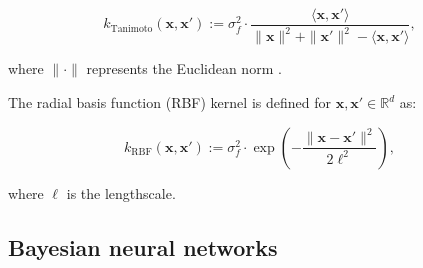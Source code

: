 $$
k_{\text{Tanimoto}}(\mathbf{x}, \mathbf{x}') := \sigma_f^2 \cdot \frac{\langle \mathbf{x}, \mathbf{x}' \rangle}{\|\mathbf{x}\|^2 + \|\mathbf{x}'\|^2 - \langle \mathbf{x}, \mathbf{x}' \rangle},
$$

where $\|\cdot\|$ represents the Euclidean norm \citep{gauche}. 

The radial basis function (RBF) kernel is defined for
$\mathbf{x}, \mathbf{x}' \in \mathbb{R}^d$ as:

$$
k_{\text{RBF}}(\mathbf{x}, \mathbf{x}') := \sigma_f^2 \cdot \exp\left(-\frac{\|\mathbf{x} - \mathbf{x}'\|^2}{2\ell^2}\right),
$$

where $\ell$ is the lengthscale.


\subsection{Bayesian neural networks}

